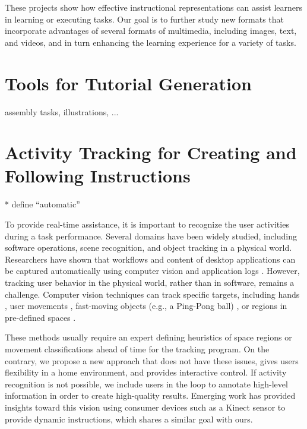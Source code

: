 These projects show how effective instructional representations can assist learners in learning or executing tasks. Our goal is to further study new formats that incorporate advantages of several formats of multimedia, including images, text, and videos, and in turn enhancing the learning experience for a variety of tasks.



\section{Tools for Tutorial Generation}
\label{background_generation}

assembly tasks, illustrations, ...



\section{Activity Tracking for Creating and Following Instructions}
\label{background_recognition}

* define ``automatic''

To provide real-time assistance, it is important to recognize the user activities during a task performance. Several domains have been widely studied, including software operations, scene recognition, and object tracking in a physical world.
%
Researchers have shown that workflows and content of desktop applications can be captured automatically using computer vision \cite{Yeh:2009dh,Chang:2011vd} and application logs \cite{Grossman:2010jz,Grabler:2009jj,Pongnumkul:2011ju}.
%
However, tracking user behavior in the physical world, rather than in software, remains a challenge. Computer vision techniques can track specific targets, including hands \cite{Ranjan:2008}, user movements \cite{Wilson:2012fb}, fast-moving objects (e.g., a Ping-Pong ball) \cite{Okumura:2011tr}, or regions in pre-defined spaces \cite{Ranjan:2007}.

These methods usually require an expert defining heuristics of space regions or movement classifications ahead of time for the tracking program.
%
On the contrary, we propose a new approach that does not have these issues, gives users flexibility in a home environment, and provides interactive control. If activity recognition is not possible, we include users in the loop to annotate high-level information in order to create high-quality results.
%
Emerging work has provided insights toward this vision using consumer devices such as a Kinect sensor \cite{Anderson:2013:YEM:2501988.2502045,Gupta:2012ku} to provide dynamic instructions, which shares a similar goal with ours.

